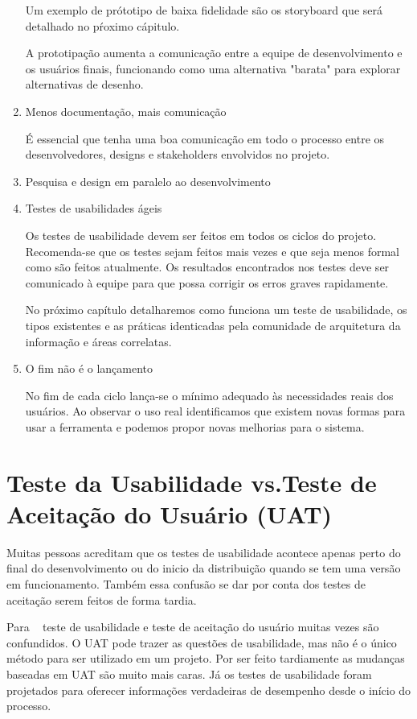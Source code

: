 \begin{enumerate}
	Um exemplo de prótotipo de baixa fidelidade são os storyboard que será detalhado no pŕoximo cápitulo. 

	A prototipação aumenta a comunicação entre a equipe de desenvolvimento e os usuários finais, funcionando como uma alternativa "barata" para explorar alternativas de desenho.
	
\item Menos documentação, mais comunicação

	É essencial que tenha uma boa comunicação em todo o processo entre os desenvolvedores, designs e stakeholders envolvidos no projeto.

\item Pesquisa e design em paralelo ao desenvolvimento


\item Testes de usabilidades ágeis

	Os testes de usabilidade devem ser feitos em todos os ciclos do projeto. Recomenda-se que os testes sejam feitos mais vezes e que seja menos formal como são feitos atualmente. Os resultados encontrados nos testes deve ser comunicado à equipe para que possa corrigir os erros  graves rapidamente.

	No próximo capítulo detalharemos como funciona um teste de usabilidade, os tipos existentes e as práticas identicadas pela comunidade de arquitetura da informação e áreas correlatas.

\item O fim não é o lançamento

	No fim de cada ciclo lança-se o mínimo adequado às necessidades reais dos usuários. Ao observar o uso real identificamos que existem novas formas para usar a ferramenta e podemos propor novas melhorias para o sistema. 
	
\end{enumerate}



\section{Teste da Usabilidade vs.Teste de Aceitação do Usuário (UAT)}

	Muitas pessoas acreditam que os testes de usabilidade acontece apenas perto do final do desenvolvimento ou do inicio da distribuição quando se tem uma versão em funcionamento. Também essa confusão se dar por conta dos testes de aceitação serem feitos de forma tardia. 

	Para ~ teste de usabilidade e teste de aceitação do usuário muitas vezes são confundidos. O UAT pode trazer as questões de usabilidade, mas não é o único método para ser utilizado em um projeto. Por ser feito tardiamente as mudanças baseadas em UAT são muito mais caras. Já os testes de usabilidade foram projetados para oferecer informações verdadeiras de desempenho desde o início do processo.  
	
